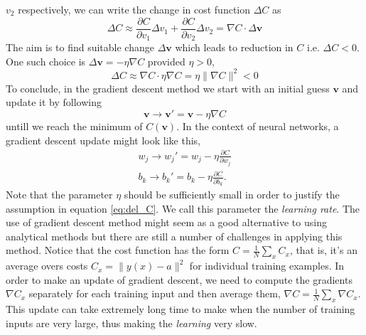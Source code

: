 $v_2$ respectively, we can write the change in cost function $\Delta C$ as
\begin{equation}
    \label{eq:del_C}
    \Delta C \approx \frac{\partial C}{\partial v_1}\Delta v_1 + \frac{\partial C}{\partial v_2} \Delta v_2 = \nabla C \cdot \Delta \mathbf{v}
\end{equation}
The aim is to find suitable change $\Delta \mathbf{v}$ which leads to reduction in $C$ i.e. $\Delta C < 0$. One such choice is $\Delta \mathbf{v} = -\eta \nabla C$ provided $\eta > 0$,
$$\Delta C \approx \nabla C \cdot \eta \nabla C = \eta \|\nabla C\|^2 < 0 $$
To conclude, in the gradient descent method we start with an initial guess $\mathbf{v}$ and update it by following
 $$\mathbf{v} \rightarrow \mathbf{v}' = \mathbf{v} - \eta \nabla C$$
untill we reach the minimum of $C(\mathbf{v})$. In the context of neural networks, a gradient descent update might look like this, 
\begin{equation}
    \begin{aligned}
        w_j \rightarrow w_j' = w_j - \eta \frac{\partial C}{\partial w_j}\\
        b_k \rightarrow b_k' = b_k - \eta \frac{\partial C}{\partial b_k}.
    \end{aligned}
\end{equation}
Note that the parameter $\eta$ should be sufficiently small in order to justify the assumption in equation \eqref{eq:del_C}. 
We call this parameter the \emph{learning rate}. The use of gradient descent method might seem as a
good alternative to using analytical methods but there are still a number of challenges in applying this method. Notice that the cost function has the form
$C = \frac{1}{N} \sum_x C_x$, that is, it's an average overs costs $C_x = \|y(x) - a\|^2$ for individual training examples. In order to make an update of gradient
descent, we need to compute the gradients $\nabla C_x$ separately for each training input and then average them, $\nabla C = \frac{1}{N} \sum_x \nabla C_x$. This update can take 
extremely long time to make when the number of training inputs are very large, thus making the \emph{learning} very slow. 

